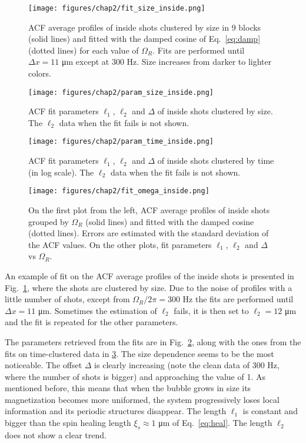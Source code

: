 \begin{figure}[ht!]
    \centering
    \texttt{[image: figures/chap2/fit\_size\_inside.png]}
    \caption{ACF average profiles of inside shots clustered by size in 9 blocks (solid lines) and fitted with the damped cosine of Eq.\ \eqref{eq:damp} (dotted lines) for each value of $\Omega_R$. Fits are performed until $\Delta x = 11$ \unit{\micro\meter} except at 300 Hz. Size increases from darker to lighter colors.}
    \label{fig:fit_size_inside}
\end{figure}
\begin{figure}[ht!]
    \centering
    \texttt{[image: figures/chap2/param\_size\_inside.png]}
    \caption{ACF fit parameters $\ell_1$, $\ell_2$ and $\Delta$ of inside shots clustered by size. The $\ell_2$ data when the fit fails is not shown.}
    \label{fig:param_size_inside}
\end{figure}
\begin{figure}[ht!]
    \centering
    \texttt{[image: figures/chap2/param\_time\_inside.png]}
    \caption{ACF fit parameters $\ell_1$, $\ell_2$ and $\Delta$ of inside shots clustered by time (in log scale). The $\ell_2$ data when the fit fails is not shown.}
    \label{fig:param_time_inside}
\end{figure}
\begin{figure}[ht!]
    \centering
    \texttt{[image: figures/chap2/fit\_omega\_inside.png]}
    \caption{On the first plot from the left, ACF average profiles of inside shots grouped by $\Omega_R$ (solid lines) and fitted with the damped cosine (dotted lines). Errors are estimated with the standard deviation of the ACF values. On the other plots, fit parameters $\ell_1$, $\ell_2$ and $\Delta$ vs $\Omega_R$.}
    \label{fig:fit_omega_inside}
\end{figure}
An example of fit on the ACF average profiles of the inside shots is presented in Fig.\ \ref{fig:fit_size_inside}, where the shots are clustered by size. Due to the noise of profiles with a little number of shots, except from $\Omega_R/2\pi = 300$ \unit{\hertz} the fits are performed until $\Delta x = 11$ \unit{\micro\meter}. Sometimes the estimation of $\ell_2$ fails, it is then set to $\ell_2 = 12$ \unit{\micro\meter} and the fit is repeated for the other parameters.

The parameters retrieved from the fits are in Fig.\ \ref{fig:param_size_inside}, along with the ones from the fits on time-clustered data in \ref{fig:param_time_inside}. 
The size dependence seems to be the most noticeable. The offset $\Delta$ is clearly increasing (note the clean data of 300 Hz, where the number of shots is bigger) and approaching the value of 1. As mentioned before, this means that when the bubble grows in size its magnetization becomes more uniformed, the system progressively loses local information and its periodic structures disappear.
The length $\ell_1$ is constant and bigger than the spin healing length $\xi_s \approx 1$ \unit{\micro\meter} of Eq.\ \eqref{eq:heal}. 
The length $\ell_2$ does not show a clear trend.

